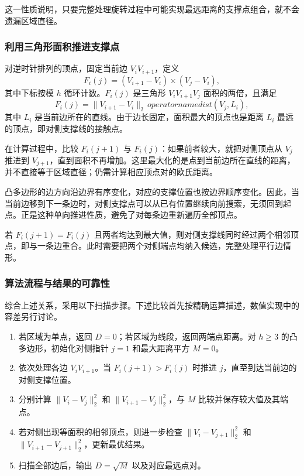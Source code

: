 这一性质说明，只要完整处理旋转过程中可能实现最远距离的支撑点组合，就不会遗漏区域直径。

\subsubsection{利用三角形面积推进支撑点}

对逆时针排列的顶点，固定当前边 $V_iV_{i+1}$，定义
\begin{equation}\label{eq:p1-area}
    F_i(j)=(V_{i+1}-V_i)\times(V_j-V_i),
\end{equation}
其中下标按模 $h$ 循环计数。$F_i(j)$ 是三角形 $V_iV_{i+1}V_j$ 面积的两倍，且满足
\begin{equation}
    F_i(j)=\|V_{i+1}-V_i\|_2\,operatorname{dist}(V_j,L_i),
\end{equation}
其中 $L_i$ 是当前边所在的直线。由于边长固定，面积最大的顶点也是距离 $L_i$ 最远的顶点，即对侧支撑线的接触点。

在计算过程中，比较 $F_i(j+1)$ 与 $F_i(j)$：如果前者较大，就把对侧顶点从 $V_j$ 推进到 $V_{j+1}$，直到面积不再增加。这里最大化的是点到当前边所在直线的距离，并不直接等于区域直径；仍需计算相应顶点对的欧氏距离。

凸多边形的边方向沿边界有序变化，对应的支撑位置也按边界顺序变化。因此，当当前边移到下一条边时，对侧支撑点可以从已有位置继续向前搜索，无须回到起点。正是这种单向推进性质，避免了对每条边重新遍历全部顶点。

若 $F_i(j+1)=F_i(j)$ 且两者均达到最大值，则对侧支撑线同时经过两个相邻顶点，即与一条边重合。此时需要把两个对侧端点均纳入候选，完整处理平行边情形。

\subsubsection{算法流程与结果的可靠性}

综合上述关系，采用以下扫描步骤。下述比较首先按精确运算描述，数值实现中的容差另行讨论。
\begin{enumerate}[label=\arabic*)]
    \item 若区域为单点，返回 $D=0$；若区域为线段，返回两端点距离。对 $h\ge3$ 的凸多边形，初始化对侧指针 $j=1$ 和最大距离平方 $M=0$。
    \item 依次处理各边 $V_iV_{i+1}$。当 $F_i(j+1)>F_i(j)$ 时推进 $j$，直至到达当前边的对侧支撑位置。
    \item 分别计算 $\|V_i-V_j\|_2^2$ 和 $\|V_{i+1}-V_j\|_2^2$，与 $M$ 比较并保存较大值及其端点。
    \item 若对侧出现等面积的相邻顶点，则进一步检查 $\|V_i-V_{j+1}\|_2^2$ 和 $\|V_{i+1}-V_{j+1}\|_2^2$，更新最优结果。
    \item 扫描全部边后，输出 $D=\sqrt M$ 以及对应最远点对。
\end{enumerate}

